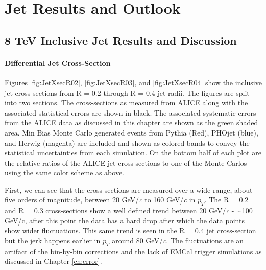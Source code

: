 \chapter{Jet Results and Outlook} \label{ch:cando}

\section{8 TeV Inclusive Jet Results and Discussion}

\subsubsection{Differential Jet Cross-Section}


\noindent
Figures \ref{fig:JetXsecR02}, \ref{fig:JetXsecR03}, and \ref{fig:JetXsecR04} show the inclusive jet cross-sections from R = 0.2 through R = 0.4 jet radii.  The figures are split into two sections.  The cross-sections as measured from ALICE along with the associated statistical errors are shown in black.  The associated systematic errors from the ALICE data as discussed in this chapter are shown as the green shaded area.  Min Bias Monte Carlo generated events from Pythia (Red), PHOjet (blue), and Herwig (magenta) are included and shown as colored bands to convey the statistical uncertainties from each simulation.  On the bottom half of each plot are the relative ratios of the ALICE jet cross-sections to one of the Monte Carlos using the same color scheme as above.  

First, we can see that the cross-sections are measured over a wide range, about five orders of magnitude, between 20 GeV/\textit{c} to 160 GeV/\textit{c} in $p_{T}$.  The R = 0.2 and R = 0.3 cross-sections show a well defined trend between 20 GeV/\textit{c} - $\sim$100 GeV/c, after this point the data  has a hard drop after which the data points show wider fluctuations.  This same trend is seen in the R = 0.4 jet cross-section but the jerk happens earlier in $p_{T}$ around  80 GeV/\textit{c}.  The fluctuations are an artifact of the bin-by-bin corrections and the lack of EMCal trigger simulations as discussed in Chapter \ref{ch:error}.  

